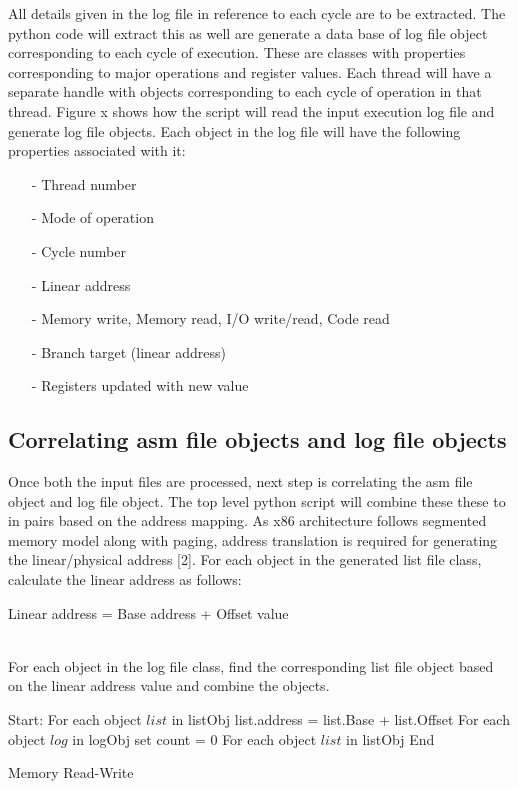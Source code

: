 All details given in the log file in reference to each cycle are to be extracted. The python code will extract this as well are generate a data base of log file object corresponding to each cycle of execution. These are classes with properties corresponding to major operations and register values. Each thread will have a separate handle with objects corresponding to each cycle of operation in that thread. Figure x shows how the script will read the input execution log file and generate log file objects.
Each object in the log file will have the following properties associated with it:

\begin{itemize}
 \item[-] Thread number
 \item[-]  Mode of operation
 \item[-]  Cycle number
 \item[-]  Linear address
 \item[-]  Memory write, Memory read, I/O write/read, Code read
 \item[-]  Branch target (linear address)
 \item[-]  Registers updated with new value
\end{itemize}


\subsection {Correlating asm file objects and log file objects}

Once both the input files are processed, next step is correlating the asm file object and log file object. The top level python script will combine these these to in pairs based on the address mapping. As x86 architecture follows segmented memory model along with paging, address translation is required for generating the linear/physical address [2]. For each object in the generated list file class, calculate the linear address as follows:
\\
\centerline{Linear address = Base address + Offset value}
\\
For each object in the log file class, find the corresponding list file object based on the linear address value and combine the objects.
\IncMargin{1em}
\begin{algorithm}[H]
\DontPrintSemicolon
{}

\BlankLine
Start: \;
For {each object $list$ in listObj}{\;
		list.address = list.Base + list.Offset\;
	}
For {each object $log$ in logObj}{\;
	set count = 0\;
	For {each object $list$ in listObj}{\;
	}
}
End \;
\caption{Memory Read-Write}
\end{algorithm}\DecMargin{1em}

